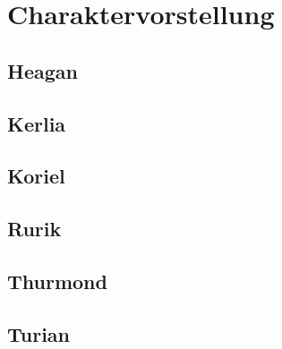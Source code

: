 \documentclass[11pt, openany]{article} %
\begin{document}
\section{Charaktervorstellung}

\subsection{Heagan}
\subsection{Kerlia}
\subsection{Koriel}
\subsection{Rurik}
\subsection{Thurmond}
\subsection{Turian}
\end{document}
